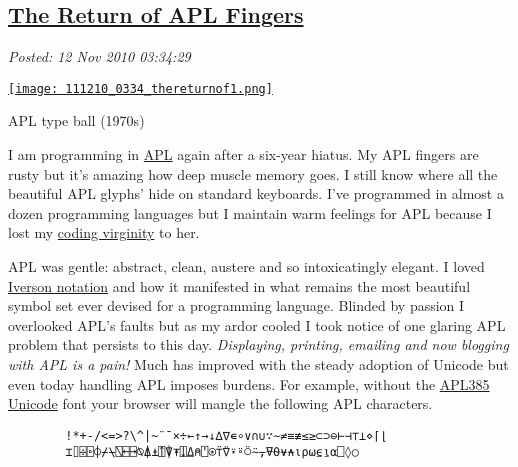 %

\subsection*{\href{http://bakerjd99.wordpress.com/2010/11/12/the-return-of-apl-fingers-2/}{The Return of APL Fingers}}


\noindent\emph{Posted: 12 Nov 2010 03:34:29}
\vspace{6pt}


\captionsetup[floatingfigure]{labelformat=empty}
\begin{floatingfigure}[r]{0.24\textwidth}
\centering
\href{http://blogs.mysql.com/kaj/2009/01/20/seven-useless-facts/}{\texttt{[image: 111210\_0334\_thereturnof1.png]}}
\caption{APL type ball (1970s)}
\label{fig:835X0}
\end{floatingfigure}I am programming in
\href{http://en.wikipedia.org/wiki/APL\_(programming\_language)}{APL}
again after a six-year hiatus. My APL fingers are rusty but it's amazing
how deep muscle memory goes. I still know where all the beautiful APL
glyphs' hide on standard keyboards. I've programmed in almost a dozen
programming languages but I maintain warm feelings for APL because I
lost my
\href{http://www.codesqueeze.com/the-ultimate-top-25-chuck-norris-the-programmer-jokes/}{coding
virginity} to her.

APL was gentle: abstract, clean, austere and so intoxicatingly elegant.
I loved \href{http://en.wikipedia.org/wiki/Kenneth\_E.\_Iverson}{Iverson
notation} and how it manifested in what remains the most beautiful
symbol set ever devised for a programming language. Blinded by passion I
overlooked APL's faults but as my ardor cooled I took notice of one
glaring APL problem that persists to this day. \emph{Displaying,
printing, emailing and now blogging with APL is a pain!} Much has
improved with the steady adoption of Unicode but even today handling APL
imposes burdens. For example, without the
\href{http://www.vector.org.uk/?area=fonts}{APL385 Unicode} font your
browser will mangle the following APL characters.

\begin{center}
\setmonofont{APL385}
\begin{verbatim}
        !*+-/<=>?\^|~¨¯×÷←↑→↓∆∇∊∘∨∩∪∵∼≠≡≢≤≥⊂⊃⊖⊢⊣⊤⊥⋄⌈⌊ 
        ⌶⌷⌹⌻⌽⌿⍀⍂⍇⍈⍉⍋⍎⍐⍒⍕⍗⍙⍝⍞⍟⍡⍢⍣⍤⍥⍨⍪⍫⍬⍱⍲⍳⍴⍵⍷⍸⍺⎕◊○
\end{verbatim}
\setmonofont[Scale=MatchLowercase]{Ubuntu Mono}
\end{center}

